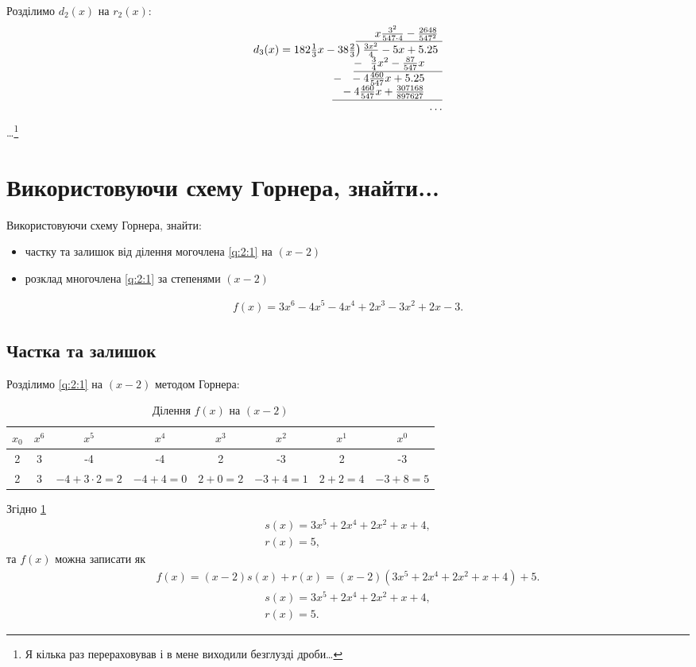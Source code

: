 Розділимо \(d_2(x)\) на \(r_2(x)\):
\begin{gather}
	\begin{array}{r}
		x\frac{3^2}{547\cdot4}-\frac{2648}{547^2}\phantom{)}   \\
		d_3(x)=182\frac{1}{3}x-38\frac{2}{3}{\overline{\smash{\big)}\,\frac{3x^2}{4}-5x+5.25\phantom{)}}}\\
		\underline{-~\phantom{(}\frac{3}{4}x^2-\frac{87}{547}x\phantom{-b)}}\\
		-~\phantom{(}-4\frac{460}{547}x+5.25\phantom{-b)}\\
		\underline{~\phantom{(}-4\frac{460}{547}x+\frac{307168}{897627}\phantom{-b)}}\\
		\dots
	\end{array}
\end{gather}
\ansver\dots\footnote{Я кілька раз перераховував і в мене виходили безглузді дроби\dots}

\newpage
\section{Використовуючи схему Горнера, знайти...}
Використовуючи схему Горнера, знайти:
\begin{itemize}
	\item частку та залишок від ділення могочлена \eqref{q:2:1} на \((x-2)\)
	\item розклад многочлена \eqref{q:2:1} за степенями \((x-2)\)
\end{itemize}
\begin{gather}
	f(x)=3x^6-4x^5-4x^4+2x^3-3x^2+2x-3.\label{q:2:1}
\end{gather}
\subsection{Частка та залишок}
\solving
Розділимо \eqref{q:2:1} на \((x-2)\) методом Горнера:
\begin{table}[H]
	\centering
	\caption{Ділення \(f(x)\) на \((x-2)\)}
	\begin{tabular}{|c|c|c|c|c|c|c|c|}
		\hline
		\(x_0\)&\(x^6\)&\(x^5\)&\(x^4\)&\(x^3\)&\(x^2\)&\(x^1\)&\(x^0\)\\
		\hline
		2&3&-4&-4&2&-3&2&-3\\
		\hline
		2&3&\(-4+3\cdot2=2\)&\(-4+4=0\)&\(2+0=2\)&\(-3+4=1\)&\(2+2=4\)&\(-3+8=5\)\\
		\hline
	\end{tabular}
\label{tab:1}
\end{table}
Згідно \cref{tab:1}
\begin{gather}
	s(x)=3x^5+2x^4+2x^2+x+4,\\
	r(x)=5,
\end{gather}
та \(f(x)\) можна записати як
\begin{gather}
	f(x)=(x-2)s(x)+r(x)=(x-2)(3x^5+2x^4+2x^2+x+4)+5.
\end{gather}
\ansver
\begin{gather}
	s(x)=3x^5+2x^4+2x^2+x+4,\\
	r(x)=5.
\end{gather}
\newpage
